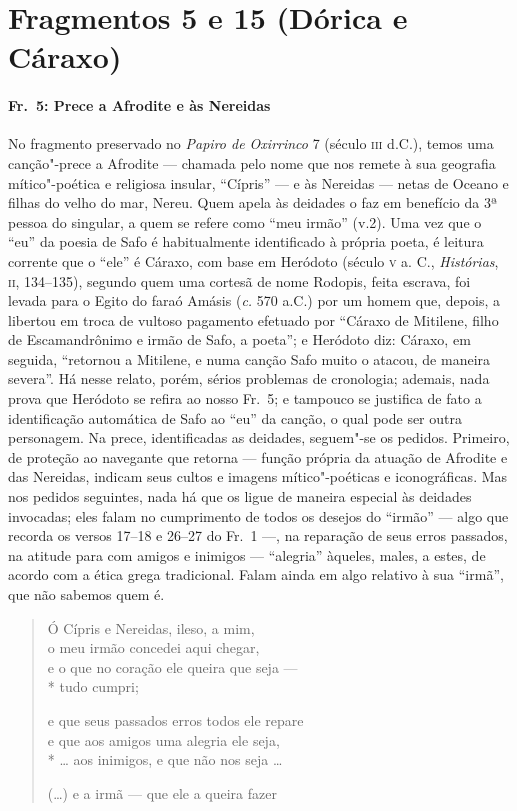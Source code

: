 \section*{Fragmentos 5 e 15 (Dórica e Cáraxo)}

\paragraph{Fr.~5: Prece a Afrodite e às Nereidas}

{\small No fragmento preservado no \textit{Papiro de Oxirrinco} 7 (século \textsc{iii} d.C.),
temos uma canção"-prece a Afrodite --- chamada pelo nome que nos remete à sua
geografia mítico"-poética e religiosa insular, “Cípris” --- e às Nereidas
--- netas de Oceano e filhas do velho do mar, Nereu. Quem apela às deidades o faz
em benefício da 3ª pessoa do singular, a quem se refere como “meu
irmão” (v.2). Uma vez que o “eu” da poesia de Safo é habitualmente
identificado à própria poeta, é leitura corrente que o “ele” é Cáraxo, com base
em Heródoto (século \textsc{v} a. C., \textit{Histórias}, \textsc{ii}, 134--135), segundo quem uma
cortesã de nome Rodopis, feita escrava, foi levada para o Egito do faraó Amásis
(\textit{c.} 570 a.C.) por um homem que, depois, a libertou em troca de vultoso
pagamento efetuado por “Cáraxo de Mitilene, filho de Escamandrônimo e
irmão de Safo, a poeta”; e Heródoto diz: Cáraxo, em seguida, “retornou
a Mitilene, e numa canção Safo muito o atacou, de maneira severa”. Há nesse
relato, porém, sérios problemas de cronologia; ademais, nada prova que Heródoto se refira ao
nosso Fr.~5; e tampouco se justifica de fato a identificação automática de
Safo ao “eu” da canção, o qual pode ser outra personagem.
Na prece, identificadas as deidades, seguem"-se os
pedidos. Primeiro, de proteção ao navegante que retorna --- função própria da
atuação de Afrodite e das Nereidas, indicam seus cultos e imagens
mítico"-poéticas e iconográficas. Mas nos pedidos seguintes, nada há que os
ligue de maneira especial às deidades invocadas; eles falam no
cumprimento de todos os desejos do “irmão” --- algo que recorda os
versos 17--18 e 26--27 do Fr.~1 ---, na reparação de seus erros passados, na
atitude para com amigos e inimigos --- “alegria” àqueles,
males, a estes, de acordo com a ética grega tradicional. Falam ainda em algo
relativo à sua ``irmã'', que não sabemos quem é.}

\begin{verse}
Ó Cípris e Nereidas, ileso, a mim,\\
o meu irmão concedei aqui chegar,\\
e o que no coração ele queira que seja ---\\*
tudo cumpri;

e que seus passados erros todos ele repare\\
e que aos amigos uma alegria ele seja,\\*
\ldots{} aos inimigos, e que não nos seja \ldots{}

(\ldots{}) e a irmã --- que ele a queira fazer
\end{verse}

